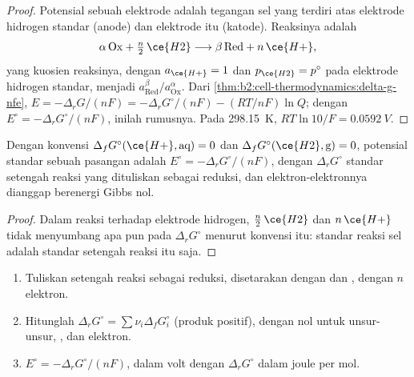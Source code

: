 \begin{proof}
Potensial sebuah elektrode adalah tegangan sel yang terdiri atas elektrode
hidrogen standar (anode) dan elektrode itu (katode). Reaksinya adalah
\[
  \alpha\,\mathrm{Ox} + \tfrac n2\,\ce{H2} \longrightarrow \beta\,\mathrm{Red} + n\,\ce{H+} ,
\]
yang kuosien reaksinya, dengan $a_{\ce{H+}} = 1$ dan $p_{\ce{H2}} = p^\circ$
pada elektrode hidrogen standar, menjadi $a_{\mathrm{Red}}^\beta/
a_{\mathrm{Ox}}^\alpha$. Dari \cref{thm:b2:cell-thermodynamics:delta-g-nfe},
$E = -\Delta_r G/(nF) = -\Delta_r G^\circ/(nF) - (RT/nF)\ln Q$; dengan
$E^\circ =
-\Delta_r G^\circ/(nF)$, inilah rumusnya. Pada \qty{298.15}{K},
$RT\ln 10/F =
\qty{0.0592}{V}$.
\end{proof}

\begin{proposition}\label{prop:b2:cell-thermodynamics:standard-potential}
Dengan konvensi $\Delta_f G^\circ(\ce{H+}, \text{aq}) = 0$ dan
$\Delta_f G^\circ(\ce{H2}, \text{g}) = 0$, potensial standar sebuah pasangan
adalah $E^\circ = -\Delta_r G^\circ/(nF)$, dengan $\Delta_r G^\circ$  standar setengah reaksi yang dituliskan sebagai reduksi, dan
elektron-elektronnya dianggap berenergi Gibbs nol.
\end{proposition}

\begin{proof}
Dalam reaksi terhadap elektrode hidrogen, $\tfrac n2\,\ce{H2}$ dan
$n\,\ce{H+}$ tidak menyumbang apa pun pada $\Delta_r G^\circ$ menurut
konvensi itu:  standar reaksi sel adalah  standar
setengah reaksi itu saja.
\end{proof}

\begin{method}\label{met:b2:cell-thermodynamics:e-from-gibbs}
\begin{enumerate}
  \item Tuliskan setengah reaksi sebagai reduksi, disetarakan dengan
         dan , dengan $n$ elektron.
  \item Hitunglah $\Delta_r G^\circ = \sum\nu_i\Delta_f G^\circ_i$ (produk
        positif), dengan nol untuk unsur-unsur, , dan elektron.
  \item $E^\circ = -\Delta_r G^\circ/(nF)$, dalam volt dengan
        $\Delta_r G^\circ$ dalam joule per mol.
\end{enumerate}
\end{method}

